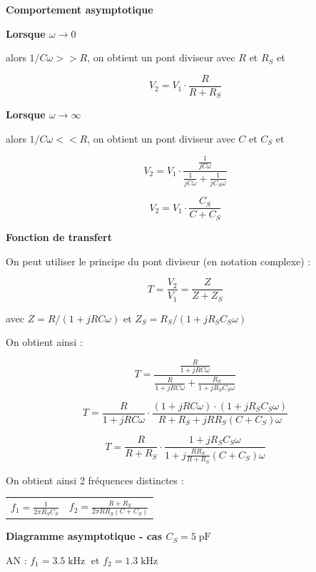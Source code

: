 \documentclass[a4paper,french]{paper}
\begin{document}
\textbf{\large Comportement asymptotique} 

\textbf{Lorsque $\omega \rightarrow 0$}
	
alors $1/C \omega >> R$, on obtient un pont diviseur avec $R$ et $R_S$ et 
	
$$V_2 = V_1 \cdot \frac{R}{R + R_S}$$
	
\medskip

\textbf{Lorsque $\omega \rightarrow \infty$}
	
alors $1/C \omega << R$, on obtient un pont diviseur avec $C$ et $C_S$ et 
	
$$V_2 = V_1 \cdot \frac{\frac{1}{j C \omega}}{\frac{1}{j C \omega} + \frac{1}{j C_S \omega}}$$
	
$$V_2 = V_1 \cdot \frac{C_S}{C + C_S}$$

\qquad

\textbf{\large Fonction de transfert}

On peut utiliser le principe du pont diviseur (en notation complexe) :

$$T = \frac{V_2}{V_1} = \frac{Z}{Z + Z_S}$$

avec $Z = R / (1 + j R C \omega)$  et $Z_S = R_S / (1 + j R_S C_S \omega)$

On obtient ainsi :

$$T =  \frac{\frac{R}{1 + j R C \omega}}{\frac{R}{1 + j R C \omega} + \frac{R_S}{1 + j R_S C_S \omega}} $$

$$T = \frac{R}{1 + j R C \omega} \cdot \frac{(1 + j R C \omega) \cdot (1 + j R_S C_S \omega)}{R + R_S + j R R_S (C + C_S) \omega} $$


$$T = \frac{R}{R + R_S} \cdot \frac{1 + j R_S C_S \omega}{1 + j \frac{R R_S}{R + R_S} (C + C_S) \omega} $$

\medskip

On obtient ainsi 2 fréquences distinctes :

\begin{center}
\begin{Large}
\begin{tabular}{cc}
$f_1 = \frac{1}{2 \pi R_S C_S}$ &
$f_2 = \frac{R + R_S}{2 \pi R R_S (C + C_S)}$\\
\end{tabular}
\end{Large}
\end{center}


\qquad

\textbf{\large Diagramme asymptotique - cas $C_S = 5\operatorname{pF}$}


AN : $f_1 = 3.5\operatorname{kHz}$ et $f_2 = 1.3\operatorname{kHz}$
\end{document}
